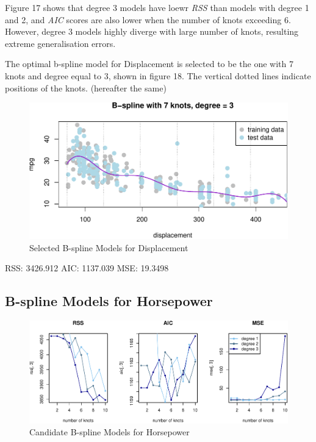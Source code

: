 \documentclass[]{article}
\begin{document}
Figure 17 shows that degree 3 models have loewr \emph{RSS} than models
with degree 1 and 2, and \emph{AIC} scores are also lower when the
number of knots exceeding 6. However, degree 3 models highly diverge
with large number of knots, resulting extreme generalisation errors.

The optimal b-spline model for Displacement is selected to be the one
with 7 knots and degree equal to 3, shown in figure 18. The vertical
dotted lines indicate positions of the knots. (hereafter the same)

\begin{figure}

{\centering \includegraphics{Report_files/figure-latex/bs-d-opt-1} 

}

\caption{Selected B-spline Models for Displacement}\label{fig:bs-d-opt}
\end{figure}

RSS: 3426.912 AIC: 1137.039 MSE: 19.3498

\hypertarget{b-spline-models-for-horsepower}{%
\subsection{B-spline Models for
Horsepower}\label{b-spline-models-for-horsepower}}

\begin{figure}

{\centering \includegraphics{Report_files/figure-latex/bs-h-1} 

}

\caption{Candidate B-spline Models for Horsepower}\label{fig:bs-h}
\end{figure}
\end{document}
